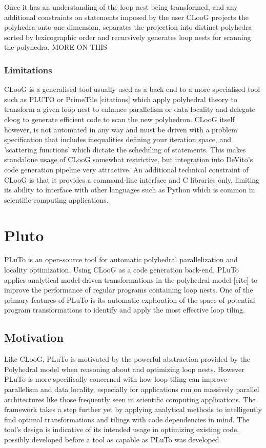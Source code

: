 \documentclass[a4paper,12pt,twoside]{report}
\begin{document}
\begin{itemize}
Once it has an understanding of the loop nest being transformed, and any additional constraints on statements imposed by the user
CLooG projects the polyhedra onto one dimension, separates the projection into distinct polyhedra sorted by lexicographic order and 
recursively generates loop nests for scanning the polyhedra. MORE ON THIS

\subsubsection{Limitations}
CLooG is a generalised tool usually used as a back-end to a more specialised tool such as PLUTO or PrimeTile [citations] which
apply polyhedral theory to transform a given loop nest to enhance parallelism or data locality and delegate cloog to generate
efficient code to scan the new polyhedron. CLooG itself however, is not automated in any way and must be driven with a problem
specification that includes inequalities defining your iteration space, and 'scattering functions' which dictate the scheduling
of statements. This makes standalone usage of CLooG somewhat restrictive, but integration into DeVito's code generation pipeline
very attractive. An additional technical constraint of CLooG is that it provides a command-line interface and C libraries only,
limiting its ability to interface with other languages such as Python which is common in scientific computing applications.

\section{Pluto}
PLuTo is an open-source tool for automatic polyhedral parallelization and locality optimization. Using CLooG as a code generation
back-end, PLuTo applies analytical model-driven transformations in the polyhedral model [cite] to improve the performance
of regular programs containing loop nests. One of the primary features of PLuTo is its automatic exploration of the space
of potential program transformations to identify and apply the most effective loop tiling.

\subsection{Motivation}
Like CLooG, PLuTo is motivated by the powerful abstraction provided by the Polyhedral model when reasoning about and optimizing loop
nests. However PLuTo is more specifically concerned with how loop tiling can improve parallelism and data locality, especially
for applications run on massively parallel architectures like those frequently seen in scientific computing applications. The framework
takes a step further yet by applying analytical methods to intelligently find optimal transformations and tilings with code dependencies in mind.
The tool's design is indicative of its intended usage in optimizing existing code, possibly developed before a tool as capable as PLuTo was developed.


\end{itemize}
\end{document}

